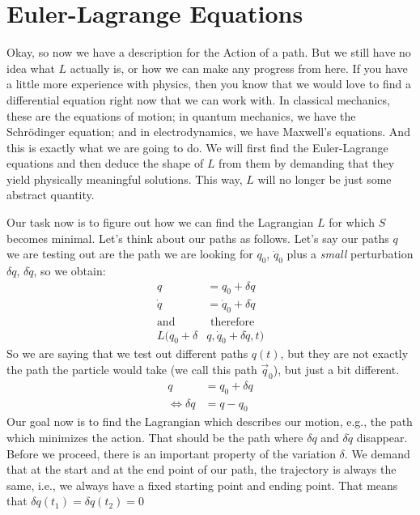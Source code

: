 \section{Euler-Lagrange Equations}
Okay, so now we have a description for the Action of a path. But we still have no idea what $L$ actually is, or how we can make any progress from here. If you have a little more experience with physics, then you know that we would love to find a differential equation right now that we can work with. In classical mechanics, these are the equations of motion; in quantum mechanics, we have the Schrödinger equation; and in electrodynamics, we have Maxwell's equations. And this is exactly what we are going to do. We will first find the Euler-Lagrange equations and then deduce the shape of $L$ from them by demanding that they yield physically meaningful solutions. This way, $L$ will no longer be just some abstract quantity.

Our task now is to figure out how we can find the Lagrangian $L$ for which $S$ becomes minimal. 
Let's think about our paths as follows. Let's say our paths $q$ we are testing out are the path we are looking for $q_0$, $\dot{q}_0$ plus a \textit{small} perturbation $\delta q$, $\delta \dot{q}$, so we obtain:
    \begin{align}
        q &= q_0 + \delta q\\
        \dot{q} &= \dot{q}_0+\delta \dot{q}\\
        \text{and}&\text{ therefore}\\
        L(q_0+\delta& q, \dot{q}_0 + \delta \dot{q}, t)
    \end{align} 
    So we are saying that we test out different paths $q(t)$, but they are not exactly the path the particle would take (we call this path $\vec{q}_0$), but just a bit different.    
    \begin{align}
        q &= q_0 + \delta q\\
        \Leftrightarrow\delta q &= q - q_0
    \end{align}
    Our goal now is to find the Lagrangian which describes our motion, e.g., the path which minimizes the action. That should be the path where $\delta q$ and $\delta \dot{q}$ disappear.
    Before we proceed, there is an important property of the variation $\delta$. We demand that at the start and at the end point of our path, the trajectory is always the same, i.e., we always have a fixed starting point and ending point. That means that $\delta q(t_1) = \delta q(t_2) = 0$
